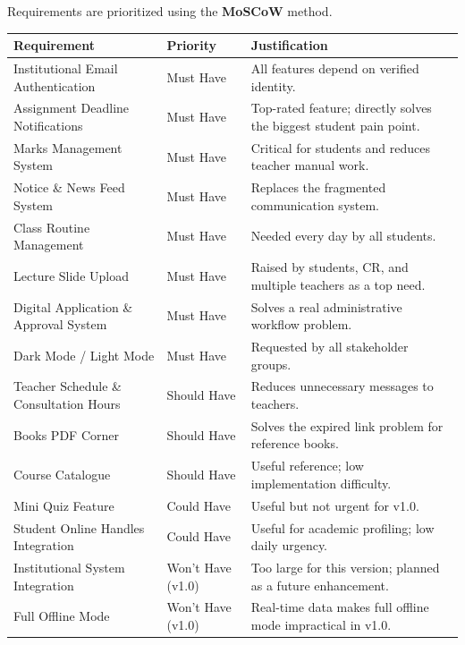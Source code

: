 \documentclass[12pt,a4paper]{article}
\newcommand{\THH}[1]{\small\bfseries\color{white} #1}
\begin{document}
Requirements are prioritized using the \textbf{MoSCoW} method.

\vspace{0.5em}
\begin{longtable}{|p{5.5cm}|>{\centering\arraybackslash}p{2.5cm}|p{5.5cm}|}
\hline
\rowcolor{navyblue}
\THH{Requirement} & \THH{Priority} & \THH{Justification} \\
\hline
\endhead
Institutional Email Authentication & Must Have & All features depend on verified identity. \\
\hline
Assignment Deadline Notifications & Must Have & Top-rated feature; directly solves the biggest student pain point. \\
\hline
Marks Management System & Must Have & Critical for students and reduces teacher manual work. \\
\hline
Notice \& News Feed System & Must Have & Replaces the fragmented communication system. \\
\hline
Class Routine Management & Must Have & Needed every day by all students. \\
\hline
Lecture Slide Upload & Must Have & Raised by students, CR, and multiple teachers as a top need. \\
\hline
Digital Application \& Approval System & Must Have & Solves a real administrative workflow problem. \\
\hline
Dark Mode / Light Mode & Must Have & Requested by all stakeholder groups. \\
\hline
Teacher Schedule \& Consultation Hours & Should Have & Reduces unnecessary messages to teachers. \\
\hline
Books PDF Corner & Should Have & Solves the expired link problem for reference books. \\
\hline
Course Catalogue & Should Have & Useful reference; low implementation difficulty. \\
\hline
Mini Quiz Feature & Could Have & Useful but not urgent for v1.0. \\
\hline
Student Online Handles Integration & Could Have & Useful for academic profiling; low daily urgency. \\
\hline
Institutional System Integration & Won't Have (v1.0) & Too large for this version; planned as a future enhancement. \\
\hline
Full Offline Mode & Won't Have (v1.0) & Real-time data makes full offline mode impractical in v1.0. \\
\hline
\end{longtable}
\newpage
\end{document}

